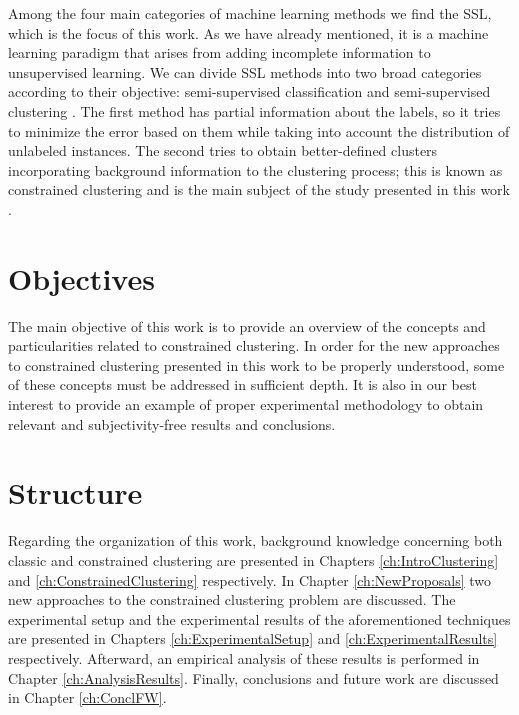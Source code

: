 Among the four main categories of machine learning methods we find the \acf{SSL}, which is the focus of this work. As we have already mentioned, it is a machine learning paradigm that arises from adding incomplete information to unsupervised learning. We can divide \acs{SSL} methods into two broad categories according to their objective: semi-supervised classification and semi-supervised clustering \cite{chapelle2009semi}. The first method has partial information about the labels, so it tries to minimize the error based on them while taking into account the distribution of unlabeled instances. The second tries to obtain better-defined clusters incorporating background information to the clustering process; this is known as constrained clustering and is the main subject of the study presented in this work \cite{triguero2015self}.

\section{Objectives}

The main objective of this work is to provide an overview of the concepts and particularities related to constrained clustering. In order for the new approaches to constrained clustering presented in this work to be properly understood, some of these concepts must be addressed in sufficient depth. It is also in our best interest to provide an example of proper experimental methodology to obtain relevant and subjectivity-free results and conclusions.

\section{Structure}

Regarding the organization of this work, background knowledge concerning both classic and constrained clustering are presented in Chapters \ref{ch:IntroClustering} and \ref{ch:ConstrainedClustering} respectively. In Chapter \ref{ch:NewProposals} two new approaches to the constrained clustering problem are discussed. The experimental setup and the experimental results of the aforementioned techniques are presented in Chapters \ref{ch:ExperimentalSetup} and \ref{ch:ExperimentalResults} respectively. Afterward, an empirical analysis of these results is performed in Chapter \ref{ch:AnalysisResults}. Finally, conclusions and future work are discussed in Chapter \ref{ch:ConclFW}.
































